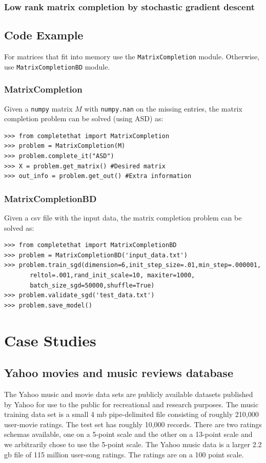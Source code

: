 \documentclass[12pt]{article}
\begin{document}
\subsubsection*{Low rank matrix completion by stochastic gradient descent}

\subsection*{Code Example}
For matrices that fit into memory use the \texttt{MatrixCompletion} module. Otherwise, use \texttt{MatrixCompletionBD} module. 

\subsubsection*{MatrixCompletion}
Given a \texttt{numpy} matrix $M$ with \texttt{numpy.nan} on the missing entries, the matrix completion problem can be solved (using ASD) as:
\begin{verbatim}
>>> from completethat import MatrixCompletion
>>> problem = MatrixCompletion(M)
>>> problem.complete_it("ASD")
>>> X = problem.get_matrix() #Desired matrix
>>> out_info = problem.get_out() #Extra information
\end{verbatim}

\subsubsection*{MatrixCompletionBD}
Given a csv file with the input data, the matrix completion problem can be solved as:

\begin{verbatim}
>>> from completethat import MatrixCompletionBD
>>> problem = MatrixCompletionBD('input_data.txt')
>>> problem.train_sgd(dimension=6,init_step_size=.01,min_step=.000001, 
       reltol=.001,rand_init_scale=10, maxiter=1000,
       batch_size_sgd=50000,shuffle=True)
>>> problem.validate_sgd('test_data.txt')
>>> problem.save_model()
\end{verbatim}

\section{Case Studies}
\subsection*{Yahoo movies and music reviews database}
The Yahoo music and movie data sets are publicly available datasets published by Yahoo for use to the public for recreational and research purposes. The music training data set is a small 4 mb pipe-delimited file consisting of roughly 210,000 user-movie ratings. The test set has roughly 10,000 records. There are two ratings schemas available, one on a 5-point scale and the other on a 13-point scale and we arbitrarily chose to use the 5-point scale. The Yahoo music data is a larger 2.2 gb file of 115 million user-song ratings. The ratings are on a 100 point scale.
 
\end{document}
